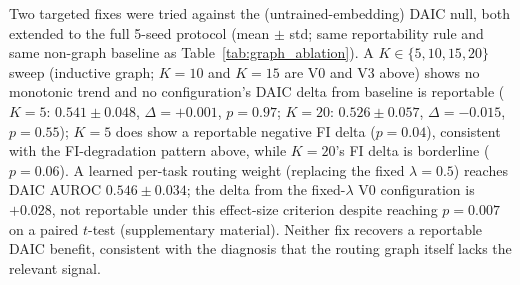 \documentclass[letterpaper]{article}
\begin{document}
\begin{table}[t]
    \centering
    \footnotesize
    \caption{DAIC test-split graph neighbours vs.\ random pairing. "Untrained embedding" is the representation used to build every V0--V4 routing graph (random projection of raw features, averaged over the 4 leakage-safe variants, 5-seed mean). "Trained representation" recomputes the same diagnostic on the 5 canonical-seed checkpoints' own fused representation (mean over 5 seeds $\times$ 4 variants; DAIC split by graph topology, Section~\ref{sec:routing-ablation}).}
    \label{tab:homophily}
\end{table}

Two targeted fixes were tried against the (untrained-embedding) DAIC null, both extended to the full 5-seed protocol (mean $\pm$ std; same reportability rule and same non-graph baseline as Table~\ref{tab:graph_ablation}). A $K\in\{5,10,15,20\}$ sweep (inductive graph; $K{=}10$ and $K{=}15$ are V0 and V3 above) shows no monotonic trend and no configuration's DAIC delta from baseline is reportable ($K{=}5$: $0.541\pm0.048$, $\Delta{=}{+}0.001$, $p{=}0.97$; $K{=}20$: $0.526\pm0.057$, $\Delta{=}{-}0.015$, $p{=}0.55$); $K{=}5$ does show a reportable negative FI delta ($p{=}0.04$), consistent with the FI-degradation pattern above, while $K{=}20$'s FI delta is borderline ($p{=}0.06$). A learned per-task routing weight (replacing the fixed $\lambda{=}0.5$) reaches DAIC AUROC $0.546\pm0.034$; the delta from the fixed-$\lambda$ V0 configuration is $+0.028$, not reportable under this effect-size criterion despite reaching $p{=}0.007$ on a paired $t$-test (supplementary material). Neither fix recovers a reportable DAIC benefit, consistent with the diagnosis that the routing graph itself lacks the relevant signal.
\end{document}
